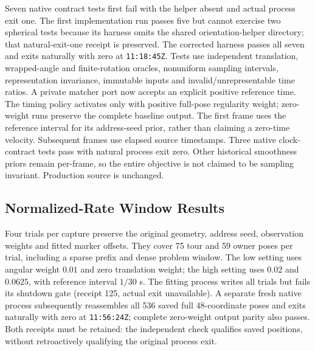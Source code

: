 \documentclass[11pt,a4paper]{article}
\begin{document}
Seven native contract tests first fail with the helper absent and actual
process exit one. The first implementation run passes five but cannot
exercise two spherical tests because its harness omits the shared
orientation-helper directory; that natural-exit-one receipt is preserved.
The corrected harness passes all seven and exits naturally with zero at
\texttt{11:18:45Z}. Tests use independent translation, wrapped-angle and
finite-rotation oracles, nonuniform sampling intervals, representation
invariance, immutable inputs and invalid/unrepresentable time ratios.
A private matcher port now accepts an explicit positive reference time.
The timing policy activates only with positive full-pose regularity weight;
zero-weight runs preserve the complete baseline output. The first frame
uses the reference interval for its address-seed prior, rather than claiming
a zero-time velocity. Subsequent frames use elapsed source timestamps.
Three native clock-contract tests pass with natural process exit zero.
Other historical smoothness priors remain per-frame, so the entire objective
is not claimed to be sampling invariant. Production source is unchanged.

\subsection{Normalized-Rate Window Results}
Four trials per capture preserve the original geometry, address seed,
observation weights and fitted marker offsets. They cover 75 tour and 59
owner poses per trial, including a sparse prefix and dense problem window.
The low setting uses angular weight $0.01$ and zero translation weight;
the high setting uses $0.02$ and $0.0625$, with reference interval $1/30$ s.
The fitting process writes all trials but fails its shutdown gate (receipt
125, actual exit unavailable). A separate fresh native process subsequently
reassembles all 536 saved full 48-coordinate poses and exits naturally with
zero at \texttt{11:56:24Z}; complete zero-weight output parity also passes.
Both receipts must be retained: the independent check qualifies saved
positions, without retroactively qualifying the original process exit.
\end{document}
